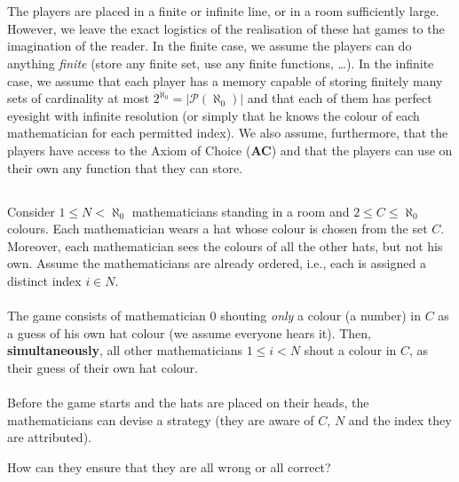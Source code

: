 \documentclass[11pt, a4paper, oneside]{article}
\theoremstyle{remark}
\theoremstyle{lemma}
\begin{document}
\\\\
The players are placed in a finite or infinite line, or in a room sufficiently large. However, we leave the exact logistics of the realisation of these hat games to the imagination of the reader. In the finite case, we assume the players can do anything \textit{finite} (store any finite set, use any finite functions, \ldots). In the infinite case, we assume that each player has a memory capable of storing finitely many sets of cardinality at most \( 2^{\aleph_0} = \left|\mathcal{P}\left(\aleph_0\right)\right| \) and that each of them has perfect eyesight with infinite resolution (or simply that he knows the colour of each mathematician for each permitted index). We also assume, furthermore, that the players have access to the Axiom of Choice (\textbf{AC}) and that the players can use on their own any function that they can store.

\subsection{}
Consider \( 1 \leq N < \aleph_0 \) mathematicians standing in a room and \( 2 \leq C \leq \aleph_0 \) colours. Each mathematician wears a hat whose colour is chosen from the set \( C \). Moreover, each mathematician sees the colours of all the other hats, but not his own. Assume the mathematicians are already ordered, i.e., each is assigned a distinct index \( i \in N \).
\\\\
The game consists of mathematician \( 0 \) shouting \textit{only} a colour (a number) in \( C \) as a guess of his own hat colour (we assume everyone hears it). Then, \textbf{simultaneously}, all other mathematicians \( 1 \leq i < N \) shout a colour in \( C \), as their guess of their own hat colour.
\\\\
Before the game starts and the hats are placed on their heads, the mathematicians can devise a strategy (they are aware of $C$, $N$ and the index they are attributed).

How can they ensure that they are all wrong or all correct?
\end{document}
